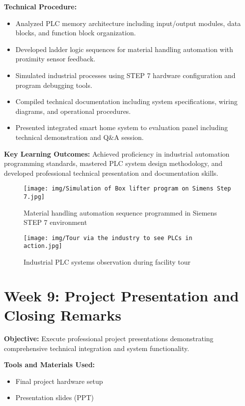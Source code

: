 \documentclass[12pt,a4paper]{report}
\begin{document}
\noindent\textbf{Technical Procedure:}
\begin{itemize}
    \item Analyzed PLC memory architecture including input/output modules, data blocks, and function block organization.
    \item Developed ladder logic sequences for material handling automation with proximity sensor feedback.
    \item Simulated industrial processes using STEP 7 hardware configuration and program debugging tools.
    \item Compiled technical documentation including system specifications, wiring diagrams, and operational procedures.
    \item Presented integrated smart home system to evaluation panel including technical demonstration and Q\&A session.
\end{itemize}

\noindent\textbf{Key Learning Outcomes:} Achieved proficiency in industrial automation programming standards, mastered PLC system design methodology, and developed professional technical presentation and documentation skills.

\begin{figure}[H]
\centering
\texttt{[image: img/Simulation of Box lifter program on Simens Step 7.jpg]}
\caption{Material handling automation sequence programmed in Siemens STEP 7 environment}
\label{fig:step7-simulation}
\end{figure}

\begin{figure}[H]
\centering
\texttt{[image: img/Tour via the industry to see PLCs in action.jpg]}
\caption{Industrial PLC systems observation during facility tour}
\label{fig:plc-tour}
\end{figure}

\section{Week 9: Project Presentation and Closing Remarks}

\noindent\textbf{Objective:} Execute professional project presentations demonstrating comprehensive technical integration and system functionality.

\noindent\textbf{Tools and Materials Used:}
\begin{itemize}
    \item Final project hardware setup
    \item Presentation slides (PPT)
\end{itemize}
\end{document}
